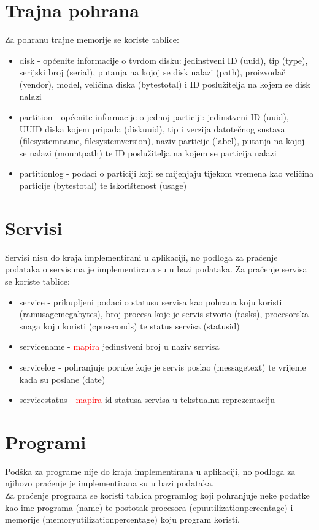 \documentclass[zavrsnirad]{fer}
\begin{document}
\section{Trajna pohrana}
Za pohranu trajne memorije se koriste tablice:
\begin{itemize}
	\item disk - općenite informacije o tvrdom disku: jedinstveni ID (uuid), tip (type), serijski broj (serial), putanja na kojoj se disk nalazi (path), proizvođač (vendor), model, veličina diska (bytestotal) i ID poslužitelja na kojem se disk nalazi
	\item partition - općenite informacije o jednoj particiji: jedinstveni ID (uuid), UUID diska kojem pripada (diskuuid), tip i verzija datotečnog sustava (filesystemname, filesystemversion), naziv particije (label), putanja na kojoj se nalazi (mountpath) te ID poslužitelja na kojem se particija nalazi
	\item partitionlog - podaci o particiji koji se mijenjaju tijekom vremena kao veličina particije (bytestotal) te iskorištenost (usage)
\end{itemize}

\section{Servisi}
Servisi nisu do kraja implementirani u aplikaciji, no podloga za praćenje podataka o servisima je implementirana su u bazi podataka. Za praćenje servisa se koriste tablice:
\begin{itemize}
	\item service - prikupljeni podaci o statusu servisa kao pohrana koju koristi (ramusagemegabytes), broj procesa koje je servis stvorio (tasks), procesorska snaga koju koristi (cpuseconds) te status servisa (statusid)
	\item servicename - \textcolor{red}{mapira} jedinstveni broj u naziv servisa
	\item servicelog - pohranjuje poruke koje je servis poslao (messagetext) te vrijeme kada su poslane (date)
	\item servicestatus - \textcolor{red}{mapira} id statusa servisa u tekstualnu reprezentaciju
\end{itemize}

\section{Programi}
Podška za programe nije do kraja implementirana u aplikaciji, no podloga za njihovo praćenje je implementirana su u bazi podataka.
\\Za praćenje programa se koristi tablica programlog koji pohranjuje  neke podatke kao ime programa (name) te postotak procesora (cpuutilizationpercentage) i memorije (memoryutilizationpercentage) koju program koristi.
\end{document}
